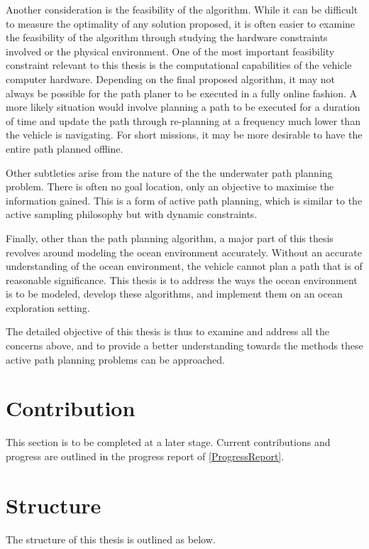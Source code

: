 		Another consideration is the feasibility of the algorithm. While it can be difficult to measure the optimality of any solution proposed, it is often easier to examine the feasibility of the algorithm through studying the hardware constraints involved or the physical environment. One of the most important feasibility constraint relevant to this thesis is the computational capabilities of the vehicle computer hardware. Depending on the final proposed algorithm, it may not always be possible for the path planer to be executed in a fully online fashion. A more likely situation would involve planning a path to be executed for a duration of time and update the path through re-planning at a frequency much lower than the vehicle is navigating. For short missions, it may be more desirable to have the entire path planned offline.
		
		Other subtleties arise from the nature of the the underwater path planning problem. There is often no goal location, only an objective to maximise the information gained. This is a form of active path planning, which is similar to the active sampling philosophy but with dynamic constraints.
		
		Finally, other than the path planning algorithm, a major part of this thesis revolves around modeling the ocean environment accurately. Without an accurate understanding of the ocean environment, the vehicle cannot plan a path that is of reasonable significance. This thesis is to address the ways the ocean environment is to be modeled, develop these algorithms, and implement them on an ocean exploration setting.
		
		The detailed objective of this thesis is thus to examine and address all the concerns above, and to provide a better understanding towards the methods these active path planning problems can be approached.
		
	\section{Contribution}
	
		{\color{BurntOrange} This section is to be completed at a later stage. Current contributions and progress are outlined in the progress report of \cref{ProgressReport}}.
		
	\section{Structure}
	
		The structure of this thesis is outlined as below.
		
